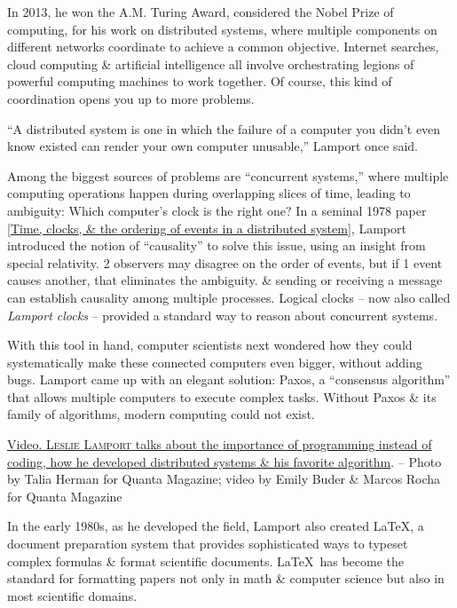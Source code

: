 \documentclass[oneside]{book}
\numberwithin{equation}{section}
\begin{document}
In 2013, he won the A.M. Turing Award, considered the Nobel Prize of computing, for his work on distributed systems, where multiple components on different networks coordinate to achieve a common objective. Internet searches, cloud computing \& artificial intelligence all involve orchestrating legions of powerful computing machines to work together. Of course, this kind of coordination opens you up to more problems.

``A distributed system is one in which the failure of a computer you didn't even know existed can render your own computer unusable,'' Lamport once said.

Among the biggest sources of problems are ``concurrent systems,'' where multiple computing operations happen during overlapping slices of time, leading to ambiguity: Which computer's clock is the right one? In a seminal 1978 paper [\href{https://dl.acm.org/doi/10.1145/359545.359563}{Time, clocks, \& the ordering of events in a distributed system}], Lamport introduced the notion of ``causality'' to solve this issue, using an insight from special relativity. 2 observers may disagree on the order of events, but if 1 event causes another, that eliminates the ambiguity. \& sending or receiving a message can establish causality among multiple processes. Logical clocks -- now also called \textit{Lamport clocks} -- provided a standard way to reason about concurrent systems.

With this tool in hand, computer scientists next wondered how they could systematically make these connected computers even bigger, without adding bugs. Lamport came up with an elegant solution: Paxos, a ``consensus algorithm'' that allows multiple computers to execute complex tasks. Without Paxos \& its family of algorithms, modern computing could not exist.

\textsf{\href{https://youtu.be/rkZzg7Vowao}{Video. \textsc{Leslie Lamport} talks about the importance of programming instead of coding, how he developed distributed systems \& his favorite algorithm}.} -- Photo by Talia Herman for Quanta Magazine; video by Emily Buder \& Marcos Rocha for Quanta Magazine

In the early 1980s, as he developed the field, Lamport also created \LaTeX, a document preparation system that provides sophisticated ways to typeset complex formulas \& format scientific documents. \LaTeX\ has become the standard for formatting papers not only in math \& computer science but also in most scientific domains.
\end{document}
